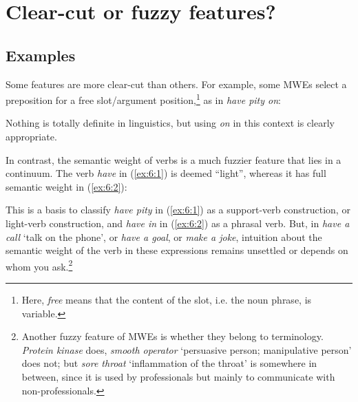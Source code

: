 \documentclass[output=paper]{langsci/langscibook}
\begin{document}
\section{Clear-cut or fuzzy features?}
\label{sec:2}

\subsection{Examples} 
\label{sec:221}

Some features are more clear-cut than others. For example, some MWEs select a preposition for a free slot/argument position,\footnote{Here, \textit{free} means that the content of the slot, i.e. the noun phrase, is variable.} as in \textit{have pity on}:

\begin{exe}
\end{exe}



\noindent Nothing is totally definite in linguistics, but using \textit{on} in this context is clearly appropriate.

In contrast, the semantic weight of verbs is a much fuzzier feature that lies in a continuum. The verb \textit{have} in (\ref{ex:6:1}) is deemed “light”, whereas it has full semantic weight in (\ref{ex:6:2}):

\begin{exe}
\end{exe}



\noindent This is a basis to classify \textit{have pity} in (\ref{ex:6:1}) as a support-verb construction, or light-verb construction, and \textit{have in} in (\ref{ex:6:2})  as a phrasal verb. But, in \textit{have a call} ‘talk on the phone’, or \textit{ have a goal}, or \textit{make a joke}, intuition about the semantic weight of the verb in these expressions remains unsettled or depends on whom you 
ask.\footnote{Another fuzzy feature of MWEs is whether they belong to terminology.\textit{ Protein kinase} does, \textit{smooth operator} ‘persuasive person; manipulative person’ does not; but \textit{sore throat} ‘inflammation of the throat’ is somewhere in between, since it is used by professionals but mainly to communicate with non-professionals.}
\end{document}
